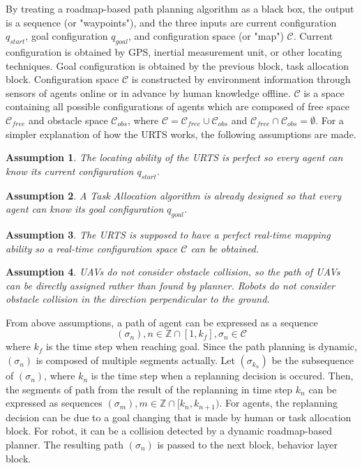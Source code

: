 \documentclass{ieeeaccess}
\newtheorem{assumption}{Assumption}[section]
\begin{document}
By treating a roadmap-based path planning algorithm as a black box, the output is a sequence (or "waypoints"), and the three inputs are current configuration $q_{start}$, goal configuration $q_{goal}$, and configuration space (or "map") $\mathcal{C}$. Current configuration is obtained by GPS, inertial measurement unit, or other locating techniques. Goal configuration is obtained by the previous block, task allocation block. Configuration space $\mathcal{C}$ is constructed by environment information through sensors of agents online or in advance by human knowledge offline. $\mathcal{C}$ is a space containing all possible configurations of agents which are composed of free space $\mathcal{C}_{free}$ and obstacle space $\mathcal{C}_{obs}$, where $\mathcal{C}=\mathcal{C}_{free}\cup\mathcal{C}_{obs}$ and $\mathcal{C}_{free}\cap\mathcal{C}_{obs}=\emptyset$. For a simpler explanation of how the URTS works, the following assumptions are made.

\begin{assumption}
    The locating ability of the URTS is perfect so every agent can know its current configuration $q_{start}$.
\end{assumption}
\begin{assumption}
    A Task Allocation algorithm is already designed so that every agent can know its goal configuration $q_{goal}$.
\end{assumption}
\begin{assumption}
    The URTS is supposed to have a perfect real-time mapping ability so a real-time configuration space $\mathcal{C}$ can be obtained.
\end{assumption}
\begin{assumption} \label{asm:collision} %
    UAVs do not consider obstacle collision, so the path of UAVs can be directly assigned rather than found by planner. Robots do not consider obstacle collision in the direction perpendicular to the ground. 
\end{assumption}

From above assumptions, a path of agent can be expressed as a sequence
\begin{equation}
    (\sigma_n), n\in\mathbb{Z}\cap[1,k_f], \sigma_n\in\mathcal{C}
\end{equation}
where $k_f$ is the time step when reaching goal. Since the path planning is dynamic, $(\sigma_n)$ is composed of multiple segments actually. Let $(\sigma_{k_n})$ be the subsequence of $(\sigma_n)$, where $k_n$ is the time step when a replanning decision is occured. Then, the segments of path from the result of the replanning in time step $k_n$ can be expressed as sequences $(\sigma_m), m\in\mathbb{Z}\cap[k_n, k_{n+1})$. For agents, the replanning decision can be due to a goal changing that is made by human or task allocation block. For robot, it can be a collision detected by a dynamic roadmap-based planner. The resulting path $(\sigma_n)$ is passed to the next block, behavior layer block.
\end{document}
